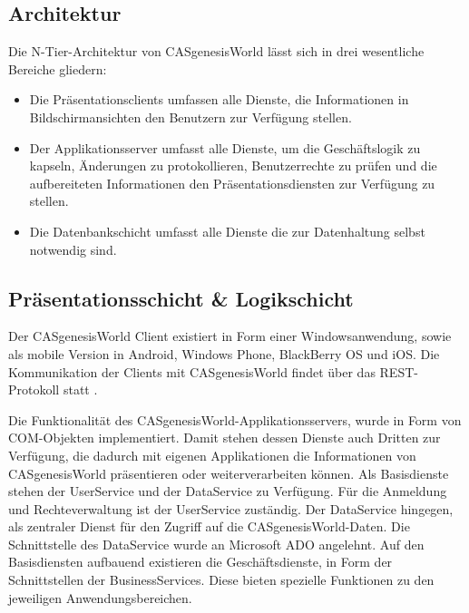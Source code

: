 \subsection{Architektur}

Die N-Tier-Architektur von CASgenesisWorld lässt sich in drei wesentliche Bereiche gliedern:

\begin{itemize}

	\item Die Präsentationsclients umfassen alle Dienste, die Informationen in Bildschirmansichten den Benutzern zur Verfügung stellen.
	
	\item Der Applikationsserver umfasst alle Dienste, um die Geschäftslogik zu kapseln, Änderungen zu protokollieren, Benutzerrechte zu prüfen und die aufbereiteten Informationen den Präsentationsdiensten zur Verfügung zu stellen.
	
	\item Die Datenbankschicht umfasst alle Dienste die zur Datenhaltung selbst notwendig sind.
\end{itemize}


\subsection{Präsentationsschicht \& Logikschicht}

Der CASgenesisWorld Client existiert in Form einer Windowsanwendung, sowie als mobile Version in Android, Windows Phone, BlackBerry OS und iOS. Die Kommunikation der Clients mit CASgenesisWorld findet über das REST-Protokoll statt \cite{cas2013a}.

Die Funktionalität des CASgenesisWorld-Applikationsservers, wurde in Form von COM-Objekten implementiert. Damit stehen dessen Dienste auch Dritten zur Verfügung, die dadurch mit eigenen Applikationen die Informationen von CASgenesisWorld präsentieren oder weiterverarbeiten können. Als Basisdienste stehen der UserService und der DataService zu Verfügung. Für die Anmeldung und Rechteverwaltung ist der UserService zuständig. Der DataService hingegen, als zentraler Dienst für den Zugriff auf die CASgenesisWorld-Daten. Die Schnittstelle des DataService wurde an Microsoft ADO angelehnt. Auf den Basisdiensten aufbauend existieren die Geschäftsdienste, in Form der Schnittstellen der BusinessServices. Diese bieten spezielle Funktionen zu den jeweiligen Anwendungsbereichen.

